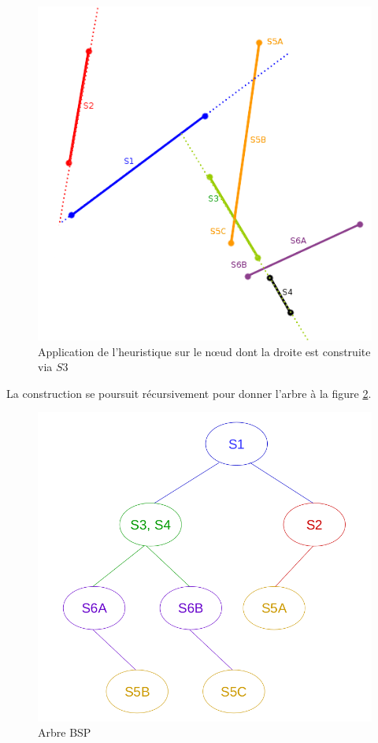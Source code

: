 \documentclass[11pt,a4paper]{article}
\theoremstyle{definition}
\theoremstyle{remark}
\begin{document}
\begin{figure}[H]
\centering
\includegraphics[scale=0.6]{bsp_ex_5.png}
\caption{Application de l'heuristique sur le nœud dont la droite est construite via $S3$}
\label{bsp_ex_5}
\end{figure}

La construction se poursuit récursivement pour donner l'arbre à la figure \ref{bsp_tree}.

\begin{figure}[H]
\centering
\includegraphics[scale=0.35]{bsp_ex_3.png}
\caption{Arbre BSP}
\label{bsp_tree}
\end{figure}
\end{document}
